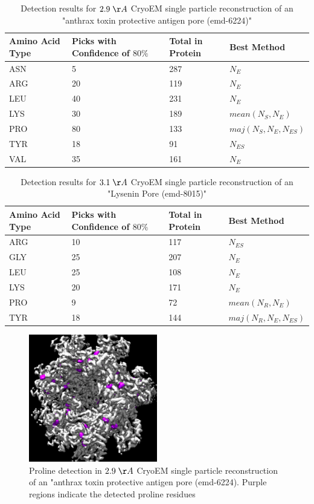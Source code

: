\begin{table}
\begin{tabular}{ | m{4em} | m{1.5cm} || m{1.5cm}|| m{2.6cm}| } 
 \hline
 Amino Acid Type & Picks with Confidence of $80\%$  & Total in Protein & Best Method \\
 \hline
\hline
ASN  & 5    & 287 & $N_E$  \\
\hline
ARG  & 20    & 119 & $N_E$  \\
\hline
LEU  & 40    & 231 & $N_E$  \\
\hline
LYS  & 30    & 189 & $mean(N_S,N_E)$  \\
\hline
PRO  & 80  & 133 & $maj(N_S,N_E,N_{ES})$  \\
\hline
TYR  & 18    & 91 & $N_{ES}$  \\
\hline
VAL  & 35    & 161 & $N_E$  \\
\hline
\end{tabular}
\caption{Detection results for $2.9 \; \AA$ CryoEM single particle reconstruction of an "anthrax toxin protective antigen pore (emd-6224)"}\label{t29}
\end{table}
\begin{table}
\begin{tabular}{ | m{4em} | m{1.5cm} || m{1.5cm}|| m{2.6cm}| } 
 \hline
 Amino Acid Type & Picks with Confidence of $80\%$  & Total in Protein & Best Method \\
 \hline
\hline
ARG  & 10  & 117 & $N_{ES}$  \\
\hline
GLY  & 25  & 207 & $N_E$  \\
\hline
LEU  & 25  & 108 & $N_E$  \\
\hline
LYS  & 20  & 171 & $N_E$  \\
\hline
PRO  & 9  & 72 & $mean(N_R,N_E)$  \\
\hline
TYR  & 18  & 144 & $maj(N_R,N_E,N_{ES})$  \\
\hline

\end{tabular}
\caption{Detection results for $3.1 \; \AA$ CryoEM single particle reconstruction of an "Lysenin Pore (emd-8015)"}\label{t31}
\end{table}

\begin{figure}[!ht]
  \caption{Proline detection in  $2.9 \; \AA$ CryoEM single particle reconstruction of an "anthrax toxin protective antigen pore (emd-6224). Purple regions indicate the detected proline residues} \label{f:PRO29}
  \centering
    \includegraphics[width=0.5\textwidth]{pics/map_PRO.png}
\end{figure}

